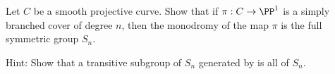 \begin{exercise}
Let $C$ be a smooth projective curve. Show that if $\pi : C \to \PP^1$
is a simply branched cover of degree $n$, then the monodromy of the map
$\pi$ is the full symmetric group $S_n$.

Hint: Show that a transitive subgroup of $S_n$ generated by 
%
is all of $S_n$.
%
\end{exercise}

